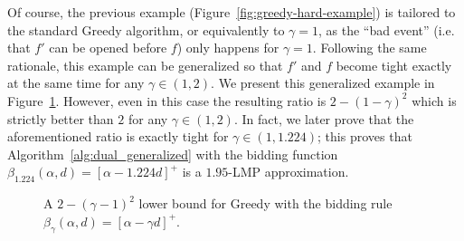 Of course, the previous example (Figure~\ref{fig:greedy-hard-example}) is tailored
to the standard Greedy algorithm, or equivalently to $\gamma = 1$, as the ``bad event'' (i.e. 
that $f'$ can be opened before $f$) only happens for $\gamma = 1$. Following the same rationale,
this example can be generalized so that $f'$ and $f$ become tight exactly at the same time for any $\gamma \in (1,2)$. We present this generalized example in Figure~\ref{fig:greedy-hard-example-gamma}.
However, even in this case the resulting ratio is $2-(1-\gamma)^2$ which is strictly better
than $2$ for any $\gamma \in (1,2)$. In fact, we later prove that the aforementioned ratio
is exactly tight for $\gamma \in (1,1.224)$; this proves that Algorithm~\ref{alg:dual_generalized} with the bidding function $\beta_{1.224}(\alpha,d) = [\alpha - 1.224 d]^+$ is a $1.95$-LMP approximation. 


\begin{figure}[h]
\centering
{}
\caption{A $2-(\gamma-1)^2$ lower bound for Greedy with the bidding rule $\beta_{\gamma}(\alpha,d)=[\alpha-\gamma d]^+$.}
\label{fig:greedy-hard-example-gamma}
\end{figure}

